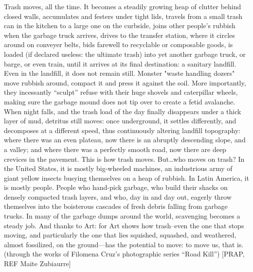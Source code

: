 Trash moves, all the time. It becomes a steadily growing heap of clutter behind closed walls, accumulates and festers under tight lids, travels from a small trash can in the kitchen to a large one on the curbside, joins other people’s rubbish when the garbage truck arrives, drives to the transfer station, where it circles around on conveyer belts, bids farewell to recyclable or composable goods, is loaded (if declared useless: the ultimate trash) into yet another garbage truck, or barge, or even train, until it arrives at its final destination: a sanitary landfill. Even in the landfill, it does not remain still. Monster "waste handling dozers" move rubbish around, compact it and press it against the soil. More importantly, they incessantly “sculpt” refuse with their huge shovels and caterpillar wheels, making sure the garbage mound does not tip over to create a fetid avalanche. When night falls, and the trash load of the day finally disappears under a thick layer of mud, detritus still moves: once underground, it settles differently, and decomposes at a different speed, thus continuously altering landfill topography: where there was an even plateau, now there is an abruptly descending slope, and a valley; and where there was a perfectly smooth road, now there are deep crevices in the pavement. This is how trash moves. But\ldots who moves on trash? In the United States, it is mostly big-wheeled machines, an industrious army of giant yellow insects busying themselves on a heap of rubbish. In Latin America, it is mostly people. People who hand-pick garbage, who build their shacks on densely compacted trash layers, and who, day in and day out, eagerly throw themselves into the boisterous cascades of fresh debris falling from garbage trucks. In many of the garbage dumps around the world, scavenging becomes a steady job.  And
thanks to Art: for Art shows how trash--even the one that stops moving, and particularly the one that lies squished, squashed, and weathered, almost fossilized, on the ground---has the potential to move: to move us, that is. (through the works of Filomena Cruz's photographic series “Road Kill”) [PRAP, REF Maite Zubiaurre]

%
